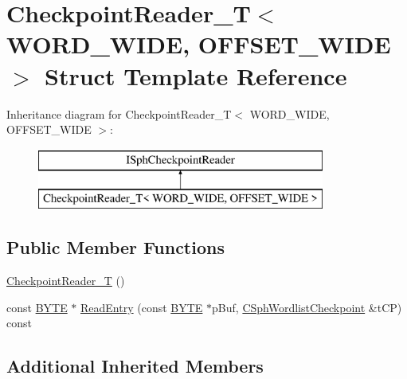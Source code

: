 \hypertarget{structCheckpointReader__T}{\section{Checkpoint\-Reader\-\_\-\-T$<$ W\-O\-R\-D\-\_\-\-W\-I\-D\-E, O\-F\-F\-S\-E\-T\-\_\-\-W\-I\-D\-E $>$ Struct Template Reference}
\label{structCheckpointReader__T}
}
Inheritance diagram for Checkpoint\-Reader\-\_\-\-T$<$ W\-O\-R\-D\-\_\-\-W\-I\-D\-E, O\-F\-F\-S\-E\-T\-\_\-\-W\-I\-D\-E $>$\-:\begin{figure}[H]
\begin{center}
\leavevmode
\includegraphics[height=2.000000cm]{structCheckpointReader__T}
\end{center}
\end{figure}
\subsection*{Public Member Functions}
\begin{DoxyCompactItemize}
\item 
\hyperlink{structCheckpointReader__T_a55c904c4a2b5c1902a74a00284461593}{Checkpoint\-Reader\-\_\-\-T} ()
\item 
const \hyperlink{sphinxstd_8h_a4ae1dab0fb4b072a66584546209e7d58}{B\-Y\-T\-E} $\ast$ \hyperlink{structCheckpointReader__T_aa9a25c438f179cdf499dc009cf12f849}{Read\-Entry} (const \hyperlink{sphinxstd_8h_a4ae1dab0fb4b072a66584546209e7d58}{B\-Y\-T\-E} $\ast$p\-Buf, \hyperlink{structCSphWordlistCheckpoint}{C\-Sph\-Wordlist\-Checkpoint} \&t\-C\-P) const 
\end{DoxyCompactItemize}
\subsection*{Additional Inherited Members}



